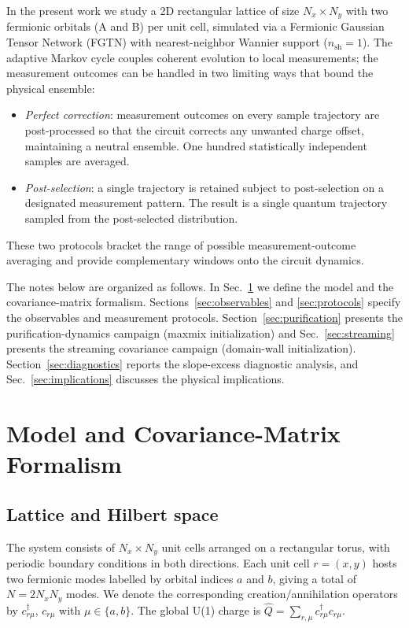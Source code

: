 \documentclass[twocolumn,aps,prx,10pt,floatfix]{revtex4-2}
\begin{document}
In the present work we study a 2D rectangular lattice of size $N_x \times N_y$
with two fermionic orbitals (A and B) per unit cell, simulated via a Fermionic
Gaussian Tensor Network (FGTN) with nearest-neighbor Wannier support ($n_\text{sh}=1$).
The adaptive Markov cycle couples coherent evolution to local measurements; the
measurement outcomes can be handled in two limiting ways that bound the physical
ensemble:
\begin{itemize}
  \item \emph{Perfect correction}: measurement outcomes on every sample trajectory
    are post-processed so that the circuit corrects any unwanted charge offset,
    maintaining a neutral ensemble.  One hundred statistically independent samples
    are averaged.
  \item \emph{Post-selection}: a single trajectory is retained subject to
    post-selection on a designated measurement pattern.  The result is a single
    quantum trajectory sampled from the post-selected distribution.
\end{itemize}
These two protocols bracket the range of possible measurement-outcome averaging
and provide complementary windows onto the circuit dynamics.

The notes below are organized as follows.  In Sec.~\ref{sec:model} we define the
model and the covariance-matrix formalism.  Sections~\ref{sec:observables} and
\ref{sec:protocols} specify the observables and measurement protocols.
Section~\ref{sec:purification} presents the purification-dynamics campaign
(maxmix initialization) and Sec.~\ref{sec:streaming} presents the streaming
covariance campaign (domain-wall initialization).  Section~\ref{sec:diagnostics}
reports the slope-excess diagnostic analysis, and Sec.~\ref{sec:implications}
discusses the physical implications.

\section{Model and Covariance-Matrix Formalism}
\label{sec:model}

\subsection{Lattice and Hilbert space}

The system consists of $N_x \times N_y$ unit cells arranged on a rectangular
torus, with periodic boundary conditions in both directions.  Each unit cell
$r = (x,y)$ hosts two fermionic modes labelled by orbital indices $a$ and $b$,
giving a total of $N = 2 N_x N_y$ modes.  We denote the corresponding
creation/annihilation operators by $c_{r\mu}^\dagger$, $c_{r\mu}$ with
$\mu \in \{a,b\}$.  The global U(1) charge is
$\hat{Q} = \sum_{r,\mu} c_{r\mu}^\dagger c_{r\mu}$.
\end{document}
